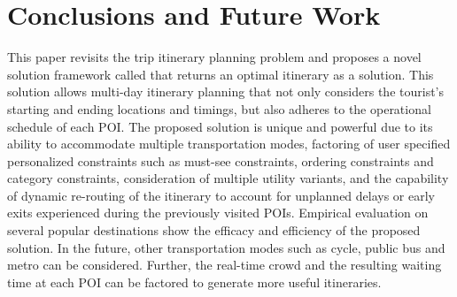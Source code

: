 \section{Conclusions and Future Work}

This paper revisits the trip itinerary planning problem and proposes a novel solution framework called \trip that returns an optimal itinerary as a solution. This solution allows multi-day itinerary planning that not only considers the tourist's starting and ending locations and timings, but also adheres to the operational schedule of each POI. The proposed solution is unique and powerful due to its ability to accommodate multiple transportation modes, factoring of user specified personalized constraints such as must-see constraints, ordering constraints and category constraints, consideration of multiple utility variants, and the capability of dynamic re-routing of the itinerary to account for unplanned delays or early exits experienced during the previously visited POIs. Empirical evaluation on several popular destinations show the   efficacy and efficiency of the proposed solution. In the future, other transportation modes such as cycle, public bus and metro can be considered. Further, the real-time crowd and the resulting waiting time at each POI can be factored to generate more useful itineraries.
